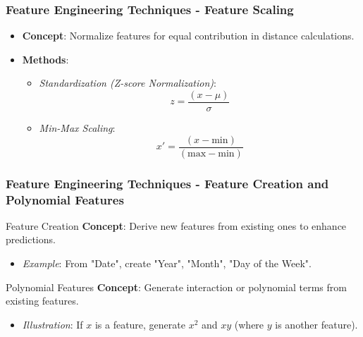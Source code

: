 \documentclass[aspectratio=169]{beamer}
\begin{document}
\begin{frame}[fragile]
    \frametitle{Feature Engineering Techniques - Feature Scaling}
    \begin{itemize}
        \item \textbf{Concept}: Normalize features for equal contribution in distance calculations.
        \item \textbf{Methods}:
        \begin{itemize}
            \item \textit{Standardization (Z-score Normalization)}:
            \begin{equation}
                z = \frac{(x - \mu)}{\sigma}
            \end{equation}
            \item \textit{Min-Max Scaling}:
            \begin{equation}
                x' = \frac{(x - \text{min})}{(\text{max} - \text{min})}
            \end{equation}
        \end{itemize}
    \end{itemize}
\end{frame}

\begin{frame}[fragile]
    \frametitle{Feature Engineering Techniques - Feature Creation and Polynomial Features}
    \begin{block}{Feature Creation}
        \textbf{Concept}: Derive new features from existing ones to enhance predictions.
        \begin{itemize}
            \item \textit{Example}: From "Date", create "Year", "Month", "Day of the Week".
        \end{itemize}
    \end{block}
    \begin{block}{Polynomial Features}
        \textbf{Concept}: Generate interaction or polynomial terms from existing features.
        \begin{itemize}
            \item \textit{Illustration}: If \(x\) is a feature, generate \(x^2\) and \(xy\) (where \(y\) is another feature).
        \end{itemize}
    \end{block}
\end{frame}
\end{document}
